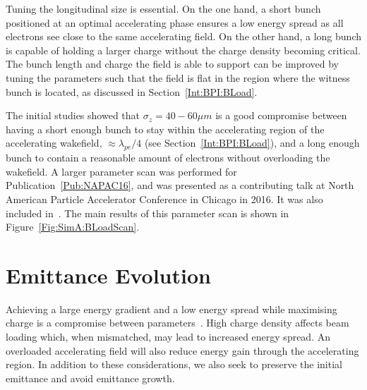Tuning the longitudinal size is essential.
On the one hand, a short bunch positioned at an optimal accelerating phase ensures a low energy spread as all electrons see close to the same accelerating field.
On the other hand, a long bunch is capable of holding a larger charge without the charge density becoming critical.
The bunch length and charge the field is able to support can be improved by tuning the parameters such that the field is flat in the region where the witness bunch is located, as discussed in Section~\ref{Int:BPI:BLoad}.

The initial studies showed that $\sigma_{z} = 40-60\unit{\mu m}$ is a good compromise between having a short enough bunch to stay within the accelerating region of the accelerating wakefield, $\approx \lambda_{pe}/4$ (see Section~\ref{Int:BPI:BLoad}), and a long enough bunch to contain a reasonable amount of electrons without overloading the wakefield.
A larger parameter scan was performed for Publication~\ref{Pub:NAPAC16}, and was presented as a contributing talk at North American Particle Accelerator Conference in Chicago in 2016.
It was also included in~\cite{adli:2016a}.
The main results of this parameter scan is shown in Figure~\ref{Fig:SimA:BLoadScan}.

\section{Emittance Evolution}
\label{SimA:Emitt}

Achieving a large energy gradient and a low energy spread while maximising charge is a compromise between parameters~\cite{berglyd_olsen:2018}.
High charge density affects beam loading which, when mismatched, may lead to increased energy spread.
An overloaded accelerating field will also reduce energy gain through the accelerating region.
In addition to these considerations, we also seek to preserve the initial emittance and avoid emittance growth.

